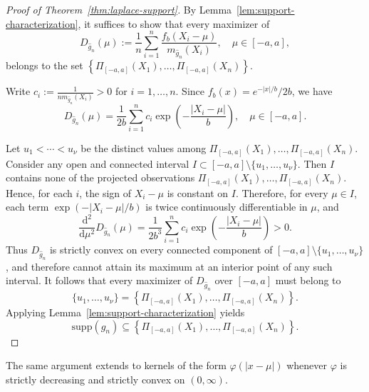 \documentclass[english, 11pt]{article}
\newcommand{\supp}{\mathrm{supp}}
\newcommand{\mrd}{\mathrm{d}}
\theoremstyle{plain}
\theoremstyle{definition}
\theoremstyle{remark}
\begin{document}
\begin{proof}[Proof of Theorem~\ref{thm:laplace-support}]
By Lemma~\ref{lem:support-characterization}, it suffices to show that every maximizer of
\begin{equation*}
D_{\widehat g_n}(\mu) := \frac{1}{n}\sum_{i=1}^n \frac{f_b(X_i-\mu)}{m_{\widehat g_n}(X_i)}, \quad \mu\in[-a,a],
\end{equation*}
belongs to the set $\left\{\Pi_{[-a,a]}(X_1),\dots,\Pi_{[-a,a]}(X_n)\right\}$.

Write $c_i:=\frac{1}{n m_{\widehat g_n}(X_i)}>0$ for $i=1,\dots,n$.
Since $f_b(x)=e^{-|x|/b}/2b$, we have
\begin{equation*}
D_{\widehat g_n}(\mu) = \frac{1}{2b}\sum_{i=1}^n c_i \exp\left(-\frac{|X_i-\mu|}{b}\right), \quad \mu\in[-a,a].
\end{equation*}

Let $u_1<\cdots<u_{\nu}$ be the distinct values among $\Pi_{[-a,a]}(X_1),\dots,\Pi_{[-a,a]}(X_n).$
Consider any open and connected interval $I\subset [-a,a]\setminus\{u_1,\dots,u_{\nu}\}$. 
Then $I$ contains none of the projected observations $\Pi_{[-a,a]}(X_1),\dots,\Pi_{[-a,a]}(X_n)$. Hence, for each $i$, the sign of $X_i-\mu$ is constant on $I$.
Therefore, for every $\mu\in I$, each term $\exp(-|X_i-\mu|/b)$ is twice continuously differentiable in $\mu$, and
\begin{equation*}
\frac{\mrd^2}{\mrd\mu^2}D_{\widehat g_n}(\mu) = \frac{1}{2b^3}\sum_{i=1}^n c_i \exp \left(-\frac{|X_i-\mu|}{b}\right) >0.
\end{equation*}
Thus $D_{\widehat g_n}$ is strictly convex on every connected component of $[-a,a]\setminus\{u_1,\dots,u_{\nu}\}$, and therefore cannot attain its maximum at an interior point of any such interval.
It follows that every maximizer of $D_{\widehat g_n}$ over $[-a,a]$ must belong to
\begin{equation*}
\{u_1,\dots,u_{\nu}\} = \left\{\Pi_{[-a,a]}(X_1),\dots,\Pi_{[-a,a]}(X_n)\right\}.
\end{equation*}
Applying Lemma~\ref{lem:support-characterization} yields
\begin{equation*}
\supp(\widehat g_n)\subseteq \left\{\Pi_{[-a,a]}(X_1),\dots,\Pi_{[-a,a]}(X_n)\right\}.
\end{equation*}
\end{proof}

The same argument extends to kernels of the form $\varphi(|x-\mu|)$ whenever $\varphi$ is strictly decreasing and strictly convex on $(0,\infty)$.
\end{document}

